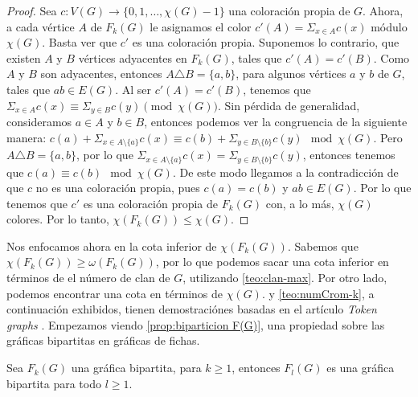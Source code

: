 \begin{proof}
    Sea $c \colon V(G) \to \{0,1, \dots, \chi(G)-1\}$ una coloraci\'on propia de
    $G$. Ahora, a cada v\'ertice $A$ de $F_k(G)$ le asignamos el color $ c'(A)=
    \Sigma_{x \in A}c(x)$ m\'odulo $\chi(G)$. Basta ver que $c'$ es una
    coloraci\'on propia. Suponemos lo contrario, que existen $A$ y $B$
    v\'ertices adyacentes en $F_k(G)$, tales que $c'(A) = c'(B)$. Como $A$ y $B$
    son adyacentes, entonces $A \triangle B = \{a,b\}$, para algunos v\'ertices
    $a$ y $b$ de $G$, tales que $ab \in E(G)$. Al ser $c'(A) = c'(B)$, tenemos
    que $\Sigma_{x \in A}c(x) \equiv \Sigma_{y \in B}c(y) \pmod {\chi(G)}$. Sin
    p\'erdida de generalidad, consideramos $a \in A$ y $b \in B$, entonces
    podemos ver la congruencia de la siguiente manera: $c(a) + \Sigma_{x \in A
    \setminus\{a\}}c(x) \equiv c(b) + \Sigma_{y \in B\setminus\{b\}}c(y) \mod
    \chi(G)$. Pero $A \triangle B = \{a,b\}$, por lo que $\Sigma_{x \in
    A\setminus\{a\}}c(x)=\Sigma_{y \in B\setminus\{b\}}c(y)$, entonces tenemos
    que $c(a) \equiv c(b) \mod \chi(G)$. De este modo llegamos a la
    contradicci\'on de que $c$ no es una coloraci\'on propia, pues $c(a) = c(b)$
    y $ab \in E(G)$. Por lo que tenemos que $c'$ es una coloraci\'on propia de
    $F_k(G)$ con, a lo m\'as, $\chi (G)$ colores. Por lo tanto, $\chi(F_k(G))
    \leq \chi (G)$.
\end{proof}

Nos enfocamos ahora en la cota inferior de $ \chi (F_k(G))$. Sabemos que $\chi
(F_k(G)) \geq \omega (F_k(G))$, por lo que podemos sacar una cota inferior en
t\'erminos de el n\'umero de clan de $G$, utilizando \cref{teo:clan-max}. Por
otro lado, podemos encontrar una cota en t\'erminos de $\chi (G)$.
 y \cref{teo:numCrom-k}, a continuaci\'on exhibidos,
tienen demostraci\'ones basadas en el art\'iculo \textit{Token graphs}
\cite{fabilaToken}. Empezamos viendo \cref{prop:biparticion F(G)}, una propiedad
sobre las gr\'aficas bipartitas en gr\'aficas de fichas.

\begin{proposicion}
\label{prop:biparticion F(G)}
    Sea $F_k(G)$ una gr\'afica bipartita, para $k \geq 1$, entonces $F_l(G)$ es
    una gr\'afica bipartita para todo $l \geq 1$.
\end{proposicion}

